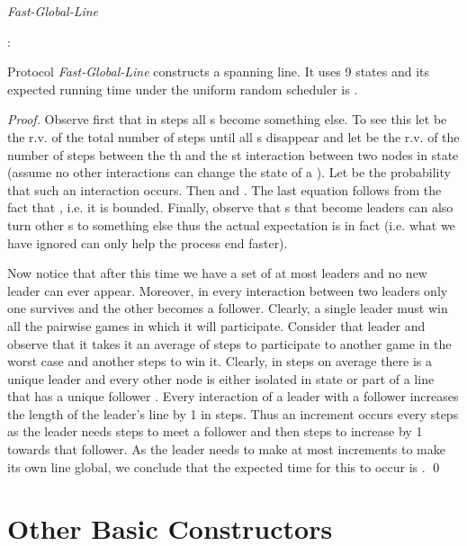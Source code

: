 \documentclass[oribibl, 11pt]{llncs}
\begin{document}
\renewcommand{\algorithmiccomment}[1]{// #1}
\begin{algorithm}[!h]
  \caption{\emph{Fast-Global-Line}}\label{prot:gline3}
  \begin{algorithmic}
    \medskip
    \State 
    \State : 
    
  \end{algorithmic}
\end{algorithm}

\begin{theorem} \label{the:gline3}
Protocol \emph{Fast-Global-Line} constructs a spanning line. It uses 9 states and its expected running time under the uniform random scheduler is .
\end{theorem}
\begin{proof}
Observe first that in  steps all s become something else. To see this let  be the r.v. of the total number of steps until all s disappear and let  be the r.v. of the number of steps between the th and the st interaction between two nodes in state  (assume no other interactions can change the state of a ). Let  be the probability that such an interaction occurs. Then  and . The last equation follows from the fact that , i.e. it is bounded. Finally, observe that s that become leaders can also turn other s to something else thus the actual expectation is in fact  (i.e. what we have ignored can only help the process end faster).

Now notice that after this  time we have a set of at most  leaders and no new leader can ever appear. Moreover, in every interaction between two leaders only one survives and the other becomes a follower. Clearly, a single leader must win all the pairwise games in which it will participate. Consider that leader and observe that it takes it an average of  steps to participate to another game in the worst case and another  steps to win it. Clearly, in  steps on average there is a unique leader and every other node is either isolated in state  or part of a line that has a unique follower . Every interaction of a leader with a follower increases the length of the leader's line by 1 in  steps. Thus an increment occurs every  steps as the leader needs  steps to meet a follower and then  steps to increase by 1 towards that follower. As the leader needs to make at most  increments to make its own line global, we conclude that the expected time for this to occur is .
\qed
\end{proof}

\section{Other Basic Constructors}
\label{sec:basic-con}
\end{document}
